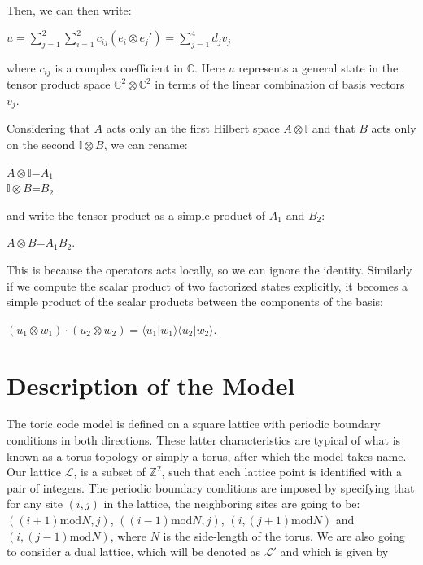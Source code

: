 \documentclass{Configuration_Files/PoliMi3i_thesis}
\begin{document}
Then, we can then write:

\begin{center}
  $u = \sum_{j=1}^{2} \sum_{i=1}^{2} c_{ij} (e_i \otimes e_j') = \sum_{j=1}^{4} d_j v_j$
\end{center}

where $c_{ij}$ is a complex coefficient in $\mathbb{C}$. Here $u$ represents a general state  in the tensor product space $\mathbb{C}^2 \otimes \mathbb{C}^2$ in terms of the linear combination of basis vectors $v_j$.


Considering that $A$ acts only an the first Hilbert space $A \otimes \mathbb{I}$ and that $B$ acts only on the second $\mathbb{I} \otimes B$, we can rename:

\begin{center}
	$A \otimes \mathbb{I}$=$A_1$ \\
	$\mathbb{I} \otimes B$=$B_2$
\end{center}

and write the tensor product as a simple product of $A_1$ and $B_2$:

\begin{center}
	$A \otimes B$=$A_1$$B_2$.
\end{center}

This is because the operators acts locally, so we can ignore the identity. \newline
Similarly if we compute the scalar product of two factorized states explicitly, it becomes a simple product of the scalar products between the components of the basis:

\begin{center}
	$(u_1 \otimes w_1) \cdot (u_2 \otimes w_2) = \langle u_1 | w_1 \rangle \langle u_2 | w_2 \rangle$.
\end{center}








\newpage
\section{Description of the Model}
\label{sec:Model}

The toric code model is defined on a square lattice with periodic boundary conditions in both directions. These latter characteristics are typical of what is known as a torus topology or simply a torus, after which the model takes name.\newline
Our lattice $\mathcal{L}$, is a subset of $\mathbb{Z}^{2}$, such that each lattice point is identified with a pair of integers. The periodic boundary conditions are imposed by specifying that for any site $(i, j)$ in the lattice, the neighboring sites are going to be: $((i+1)\mathrm{mod}N, j)$, $((i-1)\mathrm{mod} N, j)$, $(i, (j+1)\mathrm{mod}N)$ and $(i, (j-1)\mathrm{mod}N)$, where $N$ is the side-length of the torus. We are also going to consider a dual lattice, which will be denoted as $\mathcal{L}'$ and which is given by 
\end{document}
